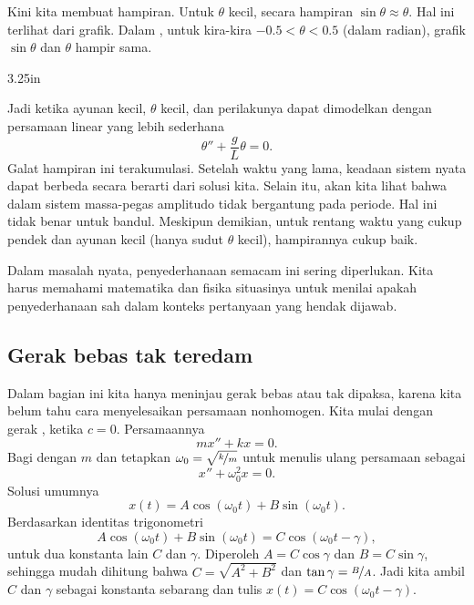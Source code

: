 Kini kita membuat hampiran. Untuk $\theta$ kecil, secara hampiran $\sin \theta \approx \theta$. Hal ini terlihat dari grafik. Dalam , untuk kira-kira $-0.5 < \theta < 0.5$ (dalam radian), grafik $\sin \theta$ dan $\theta$ hampir sama.

\begin{mywrapfig}{3.25in}
\capstart
{}
\caption{Grafik $\sin \theta$ dan $\theta$ (dalam radian).\label{mv:sinthetafig}}
\end{mywrapfig}

Jadi ketika ayunan kecil, $\theta$ kecil, dan perilakunya dapat dimodelkan dengan persamaan linear yang lebih sederhana
\begin{equation*}
\theta'' + \frac{g}{L} \theta = 0 .
\end{equation*}
Galat hampiran ini terakumulasi. Setelah waktu yang lama, keadaan sistem nyata dapat berbeda secara berarti dari solusi kita. Selain itu, akan kita lihat bahwa dalam sistem massa-pegas amplitudo tidak bergantung pada periode. Hal ini tidak benar untuk bandul. Meskipun demikian, untuk rentang waktu yang cukup pendek dan ayunan kecil (hanya sudut $\theta$ kecil), hampirannya cukup baik.

Dalam masalah nyata, penyederhanaan semacam ini sering diperlukan. Kita harus memahami matematika dan fisika situasinya untuk menilai apakah penyederhanaan sah dalam konteks pertanyaan yang hendak dijawab.

\subsection{Gerak bebas tak teredam}

Dalam bagian ini kita hanya meninjau gerak bebas atau tak dipaksa, karena kita belum tahu cara menyelesaikan persamaan nonhomogen. Kita mulai dengan gerak , ketika $c=0$. Persamaannya
\begin{equation*}
mx'' + kx = 0 .
\end{equation*}
Bagi dengan $m$ dan tetapkan $\omega_0 = \sqrt{\nicefrac{k}{m}}$ untuk menulis ulang persamaan sebagai
\begin{equation*}
x'' + \omega_0^2 x = 0 .
\end{equation*}
Solusi umumnya
\begin{equation*}
x(t) = A \cos (\omega_0 t) + B \sin (\omega_0 t) .
\end{equation*}
Berdasarkan identitas trigonometri
\begin{equation*}
A \cos (\omega_0 t) + B \sin (\omega_0 t) =
C \cos ( \omega_0 t - \gamma ) ,
\end{equation*}
untuk dua konstanta lain $C$ dan $\gamma$. Diperoleh $A = C \cos \gamma$ dan $B = C \sin \gamma$, sehingga mudah dihitung bahwa $C= \sqrt{A^2 + B^2}$ dan $\tan \gamma = \nicefrac{B}{A}$. Jadi kita ambil $C$ dan $\gamma$ sebagai konstanta sebarang dan tulis $x(t) = C \cos ( \omega_0 t - \gamma )$.

